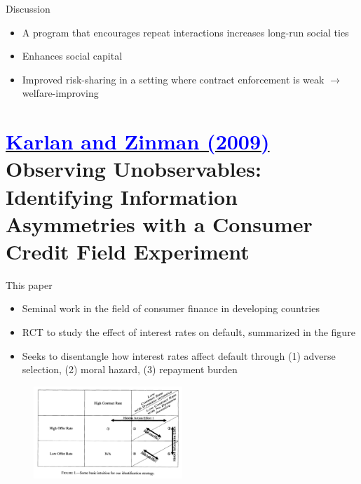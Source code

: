 \documentclass[11pt,notes=hide,aspectratio=169,mathserif]{beamer}
\begin{document}
\begin{frame}{Discussion}
\begin{itemize}
    \item A program that encourages repeat interactions increases long-run social ties 
    \pause \item Enhances social capital
    \pause \item Improved risk-sharing in a setting where contract enforcement is weak $\rightarrow$ welfare-improving 
\end{itemize}
\end{frame}

\section*{\href{https://onlinelibrary.wiley.com/doi/abs/10.3982/ECTA5781}{\textcolor{blue}{Karlan and Zinman (2009)}} \\[5mm] 
\textnormal{\small{Observing Unobservables: Identifying Information Asymmetries with a Consumer Credit Field Experiment}}}

\begin{frame}{This paper}
\begin{itemize}
    \item Seminal work in the field of consumer finance in developing countries
    \pause \item RCT to study the effect of interest rates on default, summarized in the figure
    \pause \item Seeks to disentangle how interest rates affect default through (1) adverse selection, (2) moral hazard, (3) repayment burden
\end{itemize}
\pause \begin{figure}
    \centering
    \includegraphics[width=0.5\textwidth]{inputs/main.png}
\end{figure}
\end{frame}
\end{document}
